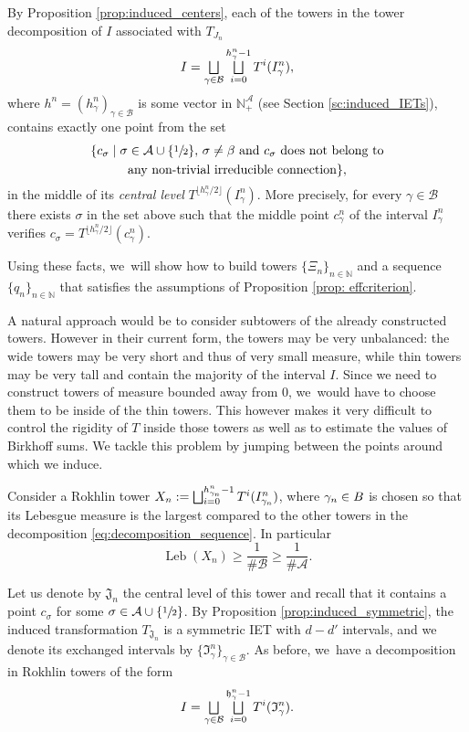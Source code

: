 \documentclass[10pt,a4paper]{amsart}
\let\oldbigsqcup\bigsqcup
\renewcommand{\bigsqcup}{\mathop{\textstyle\oldbigsqcup}\displaylimits}
\DeclareMathOperator{\Leb}{Leb}
\theoremstyle{plain}
\theoremstyle{definition}
\newcommand{\A}{\mathcal{A}}
\newcommand{\B}{\mathcal{B}}
\newcommand{\N}{\mathbb{N}}
\begin{document}
By Proposition \ref{prop:induced_centers}, each of the towers in the tower decomposition of $I$ associated with $T_{J_n}$
\begin{equation}
\label{eq:decomposition_sequence}
I = \bigsqcup_{\gamma \in \B} \bigsqcup_{i = 0}^{h_\gamma^n - 1} T^i(I_\gamma^n),
\end{equation}
where $h^n = (h^n_\gamma)_{\gamma \in \B}$ is some vector in $\N^\A_+$ (see Section \ref{sc:induced_IETs}), contains exactly one point from the set
\begin{multline*}
 \{c _\sigma \mid \sigma \in \A \cup \{\sfrac{1}{2}\},\, \sigma \neq \beta \text{ and } c_\sigma \text{ does not belong to}\\
\text{any non-trivial irreducible connection}\},
\end{multline*}
in the middle of its \emph{central level} $T^{\lfloor h_\gamma^n/2
\rfloor}(I^n_\gamma)$. More precisely, for every $\gamma \in \B$ there exists
$\sigma$ in the set above such that the middle point $c_\gamma^n$ of the
interval $I_\gamma^n$ verifies $c_\sigma = T^{\lfloor h_\gamma^n/2
\rfloor}(c_\gamma^n)$.

Using these facts, we~will show how to build towers $\{\Xi_n\}_{n\in\N}$ and a sequence $\{q_n\}_{n\in\N}$ that satisfies the assumptions of Proposition \ref{prop: effcriterion}.

A natural approach would be to consider subtowers of the already constructed towers. However in their current form, the towers may be very unbalanced: the wide towers may be very short and thus of very small measure, while thin towers may be very tall and contain the majority of the interval $I$. Since we need to construct towers of measure bounded away from 0, we~would have to choose them to be inside of the thin towers. This however makes it very difficult to control the rigidity of $T$ inside those towers as well as to estimate the values of Birkhoff sums. We tackle this problem by jumping between the points around which we induce.

Consider a Rokhlin tower $X_n:=\bigsqcup_{i=0}^{h_{\gamma_n}^n-1}T^i(I^n_{\gamma_n})$, where $\gamma_n \in\mathcal \B$ is chosen so that its Lebesgue measure is the largest compared to the other towers in the decomposition \eqref{eq:decomposition_sequence}. In particular
\[
\Leb(X_n)\geq \frac{1}{\#\B}\ge\frac{1}{\#\A}.
\]

Let us denote by $\mathfrak J_n$ the central level of this tower and recall that it contains a point $c_\sigma$ for some $\sigma \in \A \cup \{\sfrac{1}{2}\}$. By Proposition \ref{prop:induced_symmetric}, the induced transformation $T_{\mathfrak J_n}$ is a symmetric IET with $d - d'$ intervals, and we denote its exchanged intervals by $\{\mathfrak I_{\gamma}^n\}_{\gamma \in \mathcal B}$. As before, we~have a decomposition in Rokhlin towers of the form
\[
 I = \bigsqcup_{\gamma \in \B} \bigsqcup_{i = 0}^{\mathfrak h_\gamma^n - 1} T^i(\mathfrak I_\gamma^n).
\]
\end{document}
